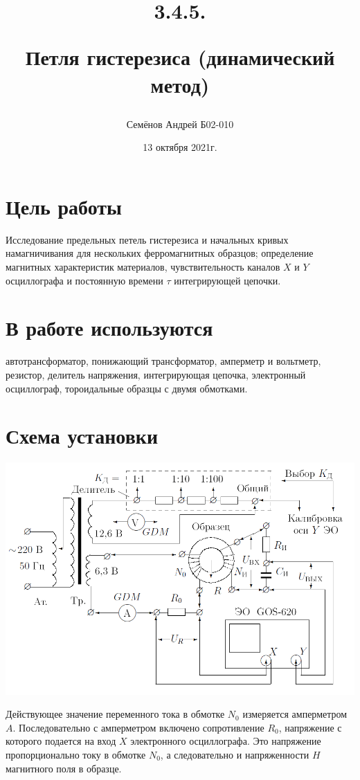 \documentclass[a4paper, 12pt]{article}%
\begin{document}
\title{
3.4.5.

Петля гистерезиса (динамический метод)
\author{Семёнов Андрей Б02-010}
}
\date{13 октября 2021г.}

\maketitle
\newpage
\section*{Цель работы}
Исследование предельных петель гистерезиса и начальных кривых намагничивания для нескольких ферромагнитных образцов; определение магнитных характеристик материалов, чувствительность каналов $X$ и $Y$ осциллографа и постоянную времени $\tau$ интегрирующей цепочки.
\section*{В работе используются}
автотрансформатор, понижающий трансформатор, амперметр и вольтметр, резистор, делитель напряжения, интегрирующая цепочка, электронный осциллограф, тороидальные образцы с двумя обмотками.
\section*{Схема установки}
\includegraphics[width = \textwidth]{1.png}

Действующее значение переменного тока в обмотке $N_0$ измеряется амперметром $A$. Последовательно с амперметром включено сопротивление $R_0$, напряжение с которого подается на вход $X$ электронного осциллографа. Это напряжение пропорционально току в обмотке $N_0$, а следовательно и напряженности $H$ магнитного поля в образце.
\end{document}
